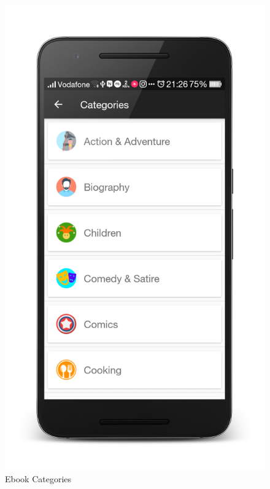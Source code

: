 \begin{figure}[ht]
\centering
\includegraphics[scale=0.13]{images/d8.png}
\caption{Ebook Categories}
\end{figure}

\newpage


